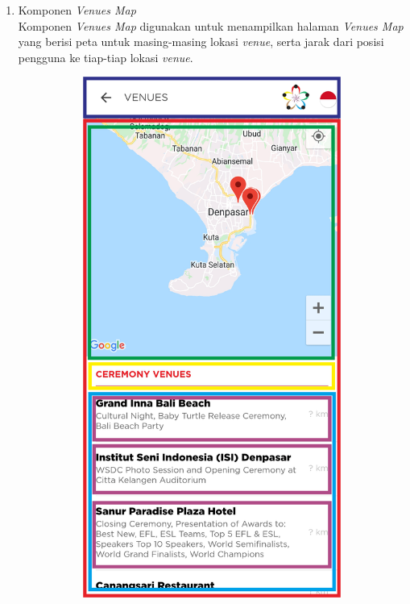 \begin{enumerate}
\begin{enumerate}
\end{enumerate}
	\newpage
	\item Komponen \textit{Venues Map} \\
	Komponen \textit{Venues Map} digunakan untuk menampilkan halaman \textit{Venues Map} yang berisi peta untuk masing-masing lokasi \textit{venue}, serta jarak dari posisi pengguna ke tiap-tiap lokasi \textit{venue}. 
	\begin{figure}[H]
    	\centering
     	\begin{subfigure}[b]{0.43\textwidth}
        	\centering
         	\includegraphics[scale=0.465]{Gambar/VenueMapPageWireframe.png}

\end{subfigure}
\end{figure}
\end{enumerate}
